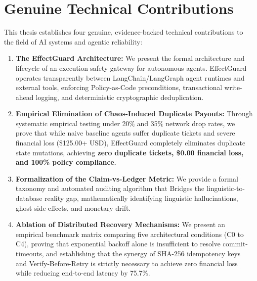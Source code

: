 \section{Genuine Technical Contributions}
\label{sec:intro_contributions}
This thesis establishes four genuine, evidence-backed technical contributions to the field of AI systems and agentic reliability:

\begin{enumerate}
    \item \textbf{The EffectGuard Architecture:} We present the formal architecture and lifecycle of an execution safety gateway for autonomous agents. EffectGuard operates transparently between LangChain/LangGraph agent runtimes and external tools, enforcing Policy-as-Code preconditions, transactional write-ahead logging, and deterministic cryptographic deduplication.
    \item \textbf{Empirical Elimination of Chaos-Induced Duplicate Payouts:} Through systematic empirical testing under 20\% and 35\% network drop rates, we prove that while naive baseline agents suffer duplicate tickets and severe financial loss (\$125.00+ USD), EffectGuard completely eliminates duplicate state mutations, achieving \textbf{zero duplicate tickets, \$0.00 financial loss, and 100\% policy compliance}.
    \item \textbf{Formalization of the Claim-vs-Ledger Metric:} We provide a formal taxonomy and automated auditing algorithm that Bridges the linguistic-to-database reality gap, mathematically identifying linguistic hallucinations, ghost side-effects, and monetary drift.
    \item \textbf{Ablation of Distributed Recovery Mechanisms:} We present an empirical benchmark matrix comparing five architectural conditions (C0 to C4), proving that exponential backoff alone is insufficient to resolve commit-timeouts, and establishing that the synergy of SHA-256 idempotency keys and Verify-Before-Retry is strictly necessary to achieve zero financial loss while reducing end-to-end latency by 75.7\%.
\end{enumerate}

